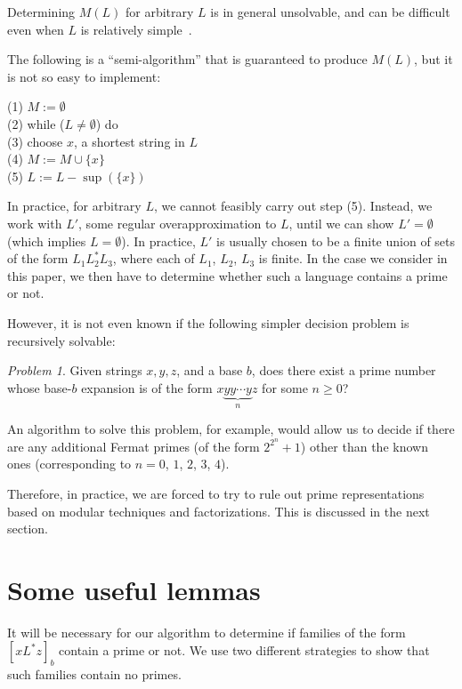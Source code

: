 \documentclass[12pt]{article}
\DeclareMathOperator\supe{sup}
\theoremstyle{plain}
\theoremstyle{definition}
\theoremstyle{remark}
\newtheorem{problem}[theorem]{Problem}
\newcommand{\0}{\mathtt{0}}
\newcommand{\1}{\mathtt{1}}
\newcommand{\2}{\mathtt{2}}
\newcommand{\3}{\mathtt{3}}
\newcommand{\4}{\mathtt{4}}
\newcommand{\5}{\mathtt{5}}
\newcommand{\6}{\mathtt{6}}
\newcommand{\7}{\mathtt{7}}
\newcommand{\8}{\mathtt{8}}
\newcommand{\9}{\mathtt{9}}
\newcommand{\union}{\cup}
\begin{document}
Determining $M(L)$ for arbitrary $L$
is in general unsolvable, and can be difficult even when $L$
is relatively simple~\cite{GHK07}.

The following is a ``semi-algorithm'' that 
is guaranteed to produce $M(L)$, but it is not so easy to implement:

\bigskip
\noindent (1) $ M := \emptyset$ \\
\noindent (2) while ($L \not= \emptyset$) do \\
\hphantom{} \qquad (3) choose $x$, a shortest string in $L$ \\
\hphantom{} \qquad (4) $ M := M \union \lbrace  x \rbrace$ \\
\hphantom{} \qquad (5) $ L := L - \supe(\lbrace x \rbrace) $ \\

\smallskip

In practice, for arbitrary $L$,
we cannot feasibly carry out step (5).  Instead, we work
with $L'$, some regular overapproximation to $L$, until we can show $L' =
\emptyset$ (which implies $L = \emptyset$).  In practice,
$L'$ is usually chosen to be a finite union of sets of the form 
$L_1 L_2^* L_3$, where each of $L_1$, $L_2$, $L_3$ is finite.
In the case we consider in this paper,
we then have to determine whether such a language contains
a prime or not.

However, it is not even known if the following simpler decision problem is 
recursively solvable:

\medskip

\begin{problem}
Given strings $x, y, z$, and a base $b$, does there exist a prime
number whose base-$b$ expansion is of the form $x \underbrace{yy\cdots y}_n z$
for some $n \geq 0$?
\end{problem}

\medskip

An algorithm to solve this problem, for example, would allow us to decide
if there are any additional Fermat primes (of the form $2^{2^n}+1$)
other than the known ones (corresponding to $n = 0$, $1$, $2$, $3$, $4$).

Therefore, in practice, we are forced to try to rule out prime
representations based on modular techniques and factorizations.
This is discussed in the next section.

\section{Some useful lemmas}\label{seclemmas}
It will be necessary for our algorithm to determine if families of the
form $[xL^*z]_b$ contain a prime or not.  We use two different strategies
to show that such families contain no primes.
\end{document}
